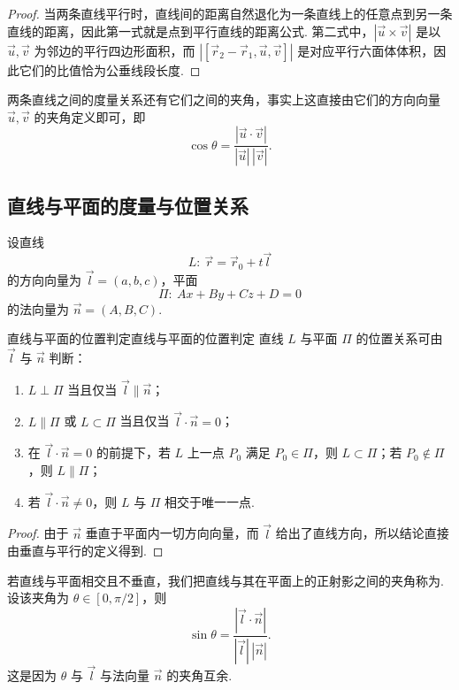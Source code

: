 \begin{proof}
    当两条直线平行时，直线间的距离自然退化为一条直线上的任意点到另一条直线的距离，因此第一式就是点到平行直线的距离公式. 第二式中，$|\vec{u}\times\vec{v}|$ 是以 $\vec{u}, \vec{v}$ 为邻边的平行四边形面积，而 $|[\vec{r}_2 - \vec{r}_1, \vec{u}, \vec{v}]|$ 是对应平行六面体体积，因此它们的比值恰为公垂线段长度.
\end{proof}

两条直线之间的度量关系还有它们之间的夹角，事实上这直接由它们的方向向量 $\vec{u}, \vec{v}$ 的夹角定义即可，即
\[
    \cos \theta = \frac{|\vec{u}\cdot\vec{v}|}{|\vec{u}|\,|\vec{v}|}.
\]

\subsection{直线与平面的度量与位置关系}

设直线
\[
    L:\ \vec{r} = \vec{r}_0 + t \vec{l}
\]
的方向向量为 $\vec{l} = (a, b, c)$，平面
\[
    \Pi:\ A x + B y + C z + D = 0
\]
的法向量为 $\vec{n} = (A, B, C)$.

\begin{theorem}{直线与平面的位置判定}{直线与平面的位置判定}
    直线 $L$ 与平面 $\Pi$ 的位置关系可由 $\vec{l}$ 与 $\vec{n}$ 判断：
    \begin{enumerate}
        \item $L \perp \Pi$ 当且仅当 $\vec{l} \parallel \vec{n}$；
        \item $L \parallel \Pi$ 或 $L \subset \Pi$ 当且仅当 $\vec{l}\cdot\vec{n} = 0$；
        \item 在 $\vec{l}\cdot\vec{n} = 0$ 的前提下，若 $L$ 上一点 $P_0$ 满足 $P_0 \in \Pi$，则 $L \subset \Pi$；若 $P_0 \notin \Pi$，则 $L \parallel \Pi$；
        \item 若 $\vec{l}\cdot\vec{n} \neq 0$，则 $L$ 与 $\Pi$ 相交于唯一一点.
    \end{enumerate}
\end{theorem}

\begin{proof}
    由于 $\vec{n}$ 垂直于平面内一切方向向量，而 $\vec{l}$ 给出了直线方向，所以结论直接由垂直与平行的定义得到.
\end{proof}

若直线与平面相交且不垂直，我们把直线与其在平面上的正射影之间的夹角称为. 设该夹角为 $\theta \in [0, \pi / 2]$，则
\[
    \sin \theta = \frac{|\vec{l}\cdot\vec{n}|}{|\vec{l}|\,|\vec{n}|}.
\]
这是因为 $\theta$ 与 $\vec{l}$ 与法向量 $\vec{n}$ 的夹角互余.

